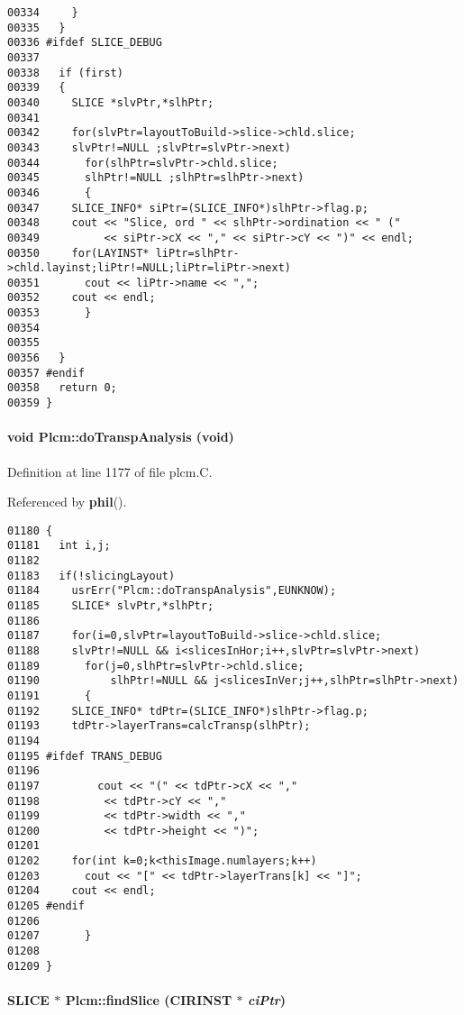 \begin{verbatim}
00334     }
00335   }
00336 #ifdef SLICE_DEBUG
00337 
00338   if (first)
00339   {
00340     SLICE *slvPtr,*slhPtr;
00341 
00342     for(slvPtr=layoutToBuild->slice->chld.slice;
00343     slvPtr!=NULL ;slvPtr=slvPtr->next)
00344       for(slhPtr=slvPtr->chld.slice;
00345       slhPtr!=NULL ;slhPtr=slhPtr->next)
00346       {
00347     SLICE_INFO* siPtr=(SLICE_INFO*)slhPtr->flag.p;
00348     cout << "Slice, ord " << slhPtr->ordination << " ("
00349          << siPtr->cX << "," << siPtr->cY << ")" << endl;
00350     for(LAYINST* liPtr=slhPtr->chld.layinst;liPtr!=NULL;liPtr=liPtr->next)
00351       cout << liPtr->name << ",";
00352     cout << endl;
00353       }
00354 
00355     
00356   }
00357 #endif
00358   return 0;
00359 }
\end{verbatim}\normalsize 
\label{Plcm_a10}
\paragraph{\setlength{\rightskip}{0pt plus 5cm}void Plcm::do\-Transp\-Analysis (void)}\hfill



Definition at line 1177 of file plcm.C.

Referenced by {\bf phil}().\small\begin{verbatim}01180 {
01181   int i,j;
01182 
01183   if(!slicingLayout)
01184     usrErr("Plcm::doTranspAnalysis",EUNKNOW);
01185     SLICE* slvPtr,*slhPtr;
01186 
01187     for(i=0,slvPtr=layoutToBuild->slice->chld.slice;
01188     slvPtr!=NULL && i<slicesInHor;i++,slvPtr=slvPtr->next)
01189       for(j=0,slhPtr=slvPtr->chld.slice;
01190           slhPtr!=NULL && j<slicesInVer;j++,slhPtr=slhPtr->next)
01191       {
01192     SLICE_INFO* tdPtr=(SLICE_INFO*)slhPtr->flag.p;
01193     tdPtr->layerTrans=calcTransp(slhPtr);
01194 
01195 #ifdef TRANS_DEBUG 
01196 
01197         cout << "(" << tdPtr->cX << ","
01198          << tdPtr->cY << ","
01199          << tdPtr->width << ","
01200          << tdPtr->height << ")";
01201     
01202     for(int k=0;k<thisImage.numlayers;k++)
01203       cout << "[" << tdPtr->layerTrans[k] << "]";
01204     cout << endl;
01205 #endif
01206 
01207       }
01208   
01209 }
\end{verbatim}\normalsize 
\label{Plcm_c14}
\paragraph{\setlength{\rightskip}{0pt plus 5cm}SLICE $\ast$ Plcm::find\-Slice (CIRINST $\ast$ {\em ci\-Ptr})\hspace{0.3cm}{\tt  [private]}}\hfill



